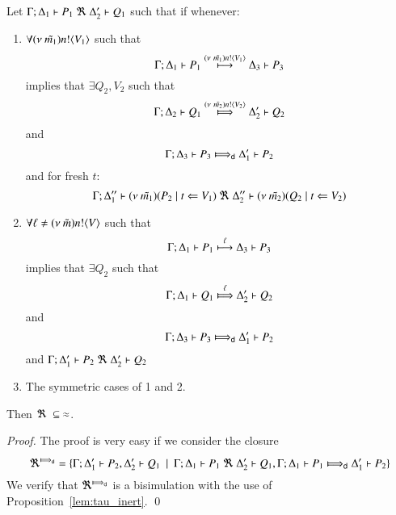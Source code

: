 \begin{lemma}\rm
	\label{lem:up_to_deterministic_transition}
	Let $\Gamma; \Delta_1 \vdash P_1 \ \Re\  \Delta_2' \vdash Q_1$ such
	that if whenever:
%
	\begin{enumerate}
		\item	$\forall (\nu\ \tilde{m_1}) n ! \langle V_1 \rangle$ such that
			\[
				\Gamma; \Delta_1 \vdash P_1 \stackrel{(\nu\ \tilde{m_1}) n ! \langle V_1 \rangle}{\longmapsto} \Delta_3 \vdash P_3
			\]
			implies that $\exists Q_2, V_2$ such that
			\[
				\horel{\Gamma}{\Delta_2}{Q_1}{\Hby{\news{\tilde{m_2}} \bactout{n}{V_2}}}{\Delta_2'}{Q_2}
			\]
			and
			\[
				\horel{\Gamma}{\Delta_3}{P_3}{\DHby{}}{\Delta_1'}{P_2}
			\]
			and for fresh $t$:
			\[
				\Gamma; \Delta_1'' \vdash (\nu\ \tilde{m_1})(P_2 \;|\; t \Leftarrow V_1) \ \Re\  \Delta_2'' \vdash{(\nu\ \tilde{m_2})(Q_2 \;|\;t \Leftarrow V_2)}
			\]
%
		\item	$\forall \ell \not= (\nu\ \tilde{m}) n ! \langle V \rangle$ such that
			\[
				\Gamma; \Delta_1 \vdash P_1 \stackrel{\ell}{\longmapsto} \Delta_3 \vdash P_3
			\]
			implies that $\exists Q_2$ such that 
			\[
				\horel{\Gamma}{\Delta_1}{Q_1}{\Hby{\ell}}{\Delta_2'}{Q_2}
			\]
			and
			\[
				\horel{\Gamma}{\Delta_3}{P_3}{\DHby{}}{\Delta_1'}{P_2}
			\]
			and
			$\Gamma; \Delta_1' \vdash P_2 \ \Re\  \Delta_2' \vdash Q_2$

		\item	The symmetric cases of 1 and 2.
	\end{enumerate}
	Then $\Re\ \subseteq\ \approx$.
\end{lemma}


\begin{proof}
	The proof is very easy if we consider the
	closure
	\[
		\Re^{\DHby{}} = \set{ \horel{\Gamma}{\Delta_1'}{P_2}{,}{\Delta_2'}{Q_1} \setbar \horel{\Gamma}{\Delta_1}{P_1}{\ \Re\ }{\Delta_2'}{Q_1},
		\horel{\Gamma}{\Delta_1}{P_1}{\DHby{}}{\Delta_1'}{P_2} }
	\]
	We verify that $\Re^{\DHby{}}$ is a bisimulation with
	the use of Proposition~\ref{lem:tau_inert}.
	\qed
\end{proof}
